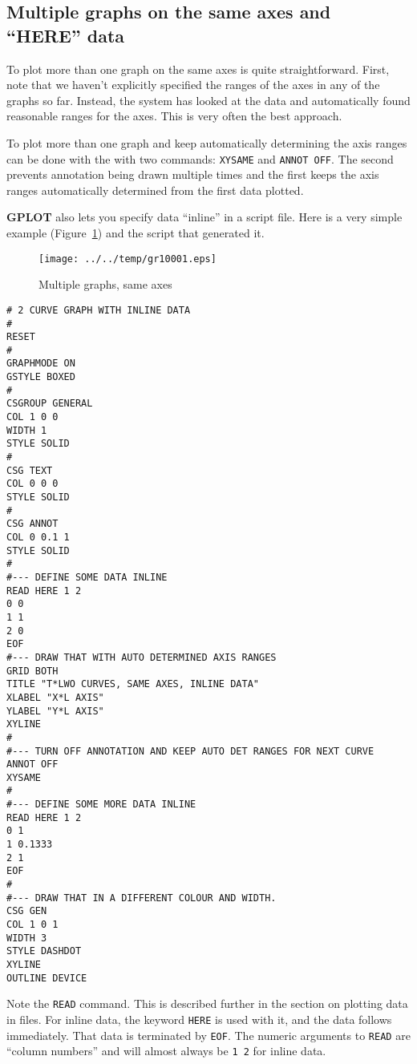 \documentclass[a4paper,twoside,11pt]{article}
\makeatletter
\def\maxwidth{%
  \ifdim\Gin@nat@width>\linewidth
    \linewidth
  \else
    \Gin@nat@width
  \fi
}
\newcommand{\newpara}{\par\vspace{4mm}\noindent}
\makeatother
\begin{document}
\subsection{Multiple graphs on the same axes and ``HERE'' data}\label{multiple-graphs-on-the-same-axes-and-here-data}
\newpara
To plot more than one graph on the same axes is quite straightforward.
First, note that we haven't explicitly specified the ranges of the axes
in any of the graphs so far. Instead, the system has looked at the data
and automatically found reasonable ranges for the axes. This is very
often the best approach.

\newpara
To plot more than one graph and keep automatically determining the axis
ranges can be done with the with two commands: \texttt{XYSAME} and
\texttt{ANNOT\ OFF}. The second prevents annotation being drawn multiple
times and the first keeps the axis ranges automatically determined from
the first data plotted.

\newpara
\textbf{GPLOT} also lets you specify data ``inline'' in a script file. Here is a
very simple example (Figure~\ref{fig:gr10001}) and the script that generated it.

\begin{figure}
  \centering
  \texttt{[image: ../../temp/gr10001.eps]}
  \caption{Multiple graphs, same axes}
  \label{fig:gr10001}
\end{figure}

\begin{lstlisting}
# 2 CURVE GRAPH WITH INLINE DATA
#
RESET
#
GRAPHMODE ON
GSTYLE BOXED
#
CSGROUP GENERAL
COL 1 0 0
WIDTH 1
STYLE SOLID
#
CSG TEXT
COL 0 0 0
STYLE SOLID
#
CSG ANNOT
COL 0 0.1 1
STYLE SOLID
#
#--- DEFINE SOME DATA INLINE 
READ HERE 1 2
0 0
1 1
2 0
EOF
#--- DRAW THAT WITH AUTO DETERMINED AXIS RANGES
GRID BOTH
TITLE "T*LWO CURVES, SAME AXES, INLINE DATA"
XLABEL "X*L AXIS"
YLABEL "Y*L AXIS"
XYLINE
#
#--- TURN OFF ANNOTATION AND KEEP AUTO DET RANGES FOR NEXT CURVE
ANNOT OFF 
XYSAME
#
#--- DEFINE SOME MORE DATA INLINE
READ HERE 1 2
0 1
1 0.1333
2 1
EOF
#
#--- DRAW THAT IN A DIFFERENT COLOUR AND WIDTH.
CSG GEN
COL 1 0 1
WIDTH 3
STYLE DASHDOT
XYLINE
OUTLINE DEVICE
\end{lstlisting}

\newpara
Note the \texttt{READ} command. This is described further in the section
on plotting data in files. For inline data, the keyword \texttt{HERE} is
used with it, and the data follows immediately. That data is terminated
by \texttt{EOF}. The numeric arguments to \texttt{READ} are ``column
numbers'' and will almost always be \texttt{1\ 2} for inline data.
\end{document}

